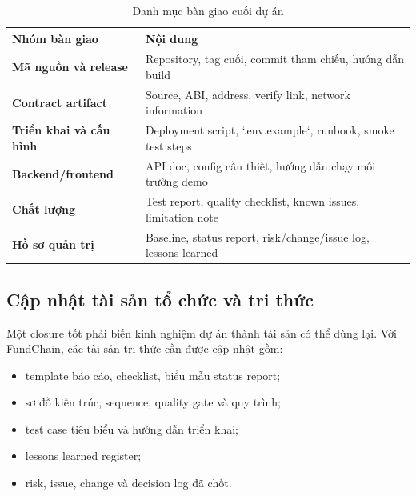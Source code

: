 \begin{table}[H]
\centering
\caption{Danh mục bàn giao cuối dự án}
\label{tab:handover-items}
\begin{tabularx}{\textwidth}{| >{\bfseries}p{4.2cm} | X |}
\hline
Nhóm bàn giao & Nội dung \\
\hline
Mã nguồn và release & Repository, tag cuối, commit tham chiếu, hướng dẫn build \\ \hline
Contract artifact & Source, ABI, address, verify link, network information \\ \hline
Triển khai và cấu hình & Deployment script, `.env.example`, runbook, smoke test steps \\ \hline
Backend/frontend & API doc, config cần thiết, hướng dẫn chạy môi trường demo \\ \hline
Chất lượng & Test report, quality checklist, known issues, limitation note \\ \hline
Hồ sơ quản trị & Baseline, status report, risk/change/issue log, lessons learned \\
\hline
\end{tabularx}
\end{table}

\subsection{Cập nhật tài sản tổ chức và tri thức}

Một closure tốt phải biến kinh nghiệm dự án thành tài sản có thể dùng lại. Với FundChain, các tài sản tri thức cần được cập nhật gồm:

\begin{itemize}
  \item template báo cáo, checklist, biểu mẫu status report;
  \item sơ đồ kiến trúc, sequence, quality gate và quy trình;
  \item test case tiêu biểu và hướng dẫn triển khai;
  \item lessons learned register;
  \item risk, issue, change và decision log đã chốt.
\end{itemize}


